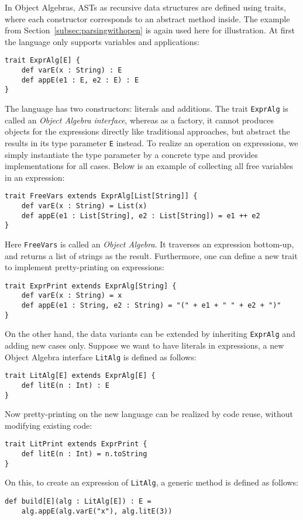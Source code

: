 In Object Algebras, ASTs as recursive data structures are defined using traits, where each constructor corresponds
to an abstract method inside. The example from Section~\ref{subsec:parsingwithopen} is again used here for illustration.
At first the language only supports variables and applications:
\begin{lstlisting}
trait ExprAlg[E] {
    def varE(x : String) : E
    def appE(e1 : E, e2 : E) : E
}
\end{lstlisting}
The language has two constructors: literals and additions. The trait \lstinline{ExprAlg} is called an \textit{Object Algebra interface},
whereas as a factory, it cannot produces objects for the expressions directly like traditional approaches, but abstract the results in its
type parameter \lstinline{E} instead. To realize an operation on expressions, we simply instantiate the type parameter by a concrete type and
provides implementations for all cases. Below is an example of collecting all free variables in an expression:
\begin{lstlisting}
trait FreeVars extends ExprAlg[List[String]] {
    def varE(x : String) = List(x)
    def appE(e1 : List[String], e2 : List[String]) = e1 ++ e2
}
\end{lstlisting}
Here \lstinline{FreeVars} is called an \textit{Object Algebra}. It traverses an expression bottom-up, and returns a list of strings as the result.
Furthermore, one can define a new trait to implement pretty-printing on expressions:
\begin{lstlisting}
trait ExprPrint extends ExprAlg[String] {
    def varE(x : String) = x
    def appE(e1 : String, e2 : String) = "(" + e1 + " " + e2 + ")"
}
\end{lstlisting}
On the other hand, the data variants can be extended by inheriting \lstinline{ExprAlg} and adding new cases only. Suppose we want to
have literals in expressions, a new Object Algebra interface \lstinline{LitAlg} is defined as follows:
\begin{lstlisting}
trait LitAlg[E] extends ExprAlg[E] {
    def litE(n : Int) : E
}
\end{lstlisting}
Now pretty-printing on the new language can be realized by code reuse, without modifying existing code:
\begin{lstlisting}
trait LitPrint extends ExprPrint {
    def litE(n : Int) = n.toString
}
\end{lstlisting}
On this, to create an expression of \lstinline{LitAlg}, a generic method is defined as follows:
\begin{lstlisting}
def build[E](alg : LitAlg[E]) : E =
    alg.appE(alg.varE("x"), alg.litE(3))
\end{lstlisting}
